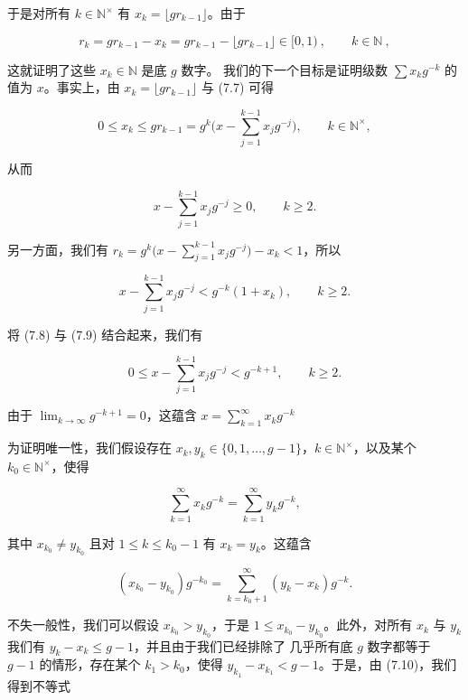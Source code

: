 \begin{theorem}
\begin{items}
于是对所有 $ k \in \mathbb{N}^\times $ 有 $ x_k = \lfloor gr_{k-1} \rfloor $。由于

\[
r_{k}=g r_{k-1}-x_{k}=g r_{k-1}-\lfloor g r_{k-1}\rfloor\in[0,1)~,\qquad k\in\mathbb{N}~,
\]

这就证明了这些 $ x_k \in \mathbb{N} $ 是底 $ g $ 数字。
我们的下一个目标是证明级数 $ \sum x_kg^{-k} $ 的值为 $ x $。事实上，由 $ x_k = \lfloor gr_{k-1} \rfloor $ 与 (7.7) 可得

\[
0\leq x_{k}\leq g r_{k-1}=g^{k}\Big(x-\sum_{j=1}^{k-1}x_{j}g^{-j}\Big),\qquad k\in\mathbb{N}^{\times},
\]

从而

\begin{equation}
x-\sum_{j=1}^{k-1}x_{j}g^{-j}\geq0,\qquad k\geq2.
\end{equation}

另一方面，我们有 $ r_k = g^k \big( x - \sum_{j=1}^{k-1} x_j g^{-j} \big) - x_k < 1 $，所以

\begin{equation}
x-\sum_{j=1}^{k-1}x_{j}g^{-j}<g^{-k}(1+x_{k}),\qquad k\geq2.
\end{equation}

将 (7.8) 与 (7.9) 结合起来，我们有

\[
0\leq x-\sum_{j=1}^{k-1}x_{j}g^{-j}<g^{-k+1},\qquad k\geq2.
\]

由于 $ \lim_{k \to \infty} g^{-k+1} = 0 $，这蕴含 $ x = \sum_{k=1}^{\infty} x_k g^{-k} $

\item

为证明唯一性，我们假设存在 $ x_k, y_k \in \{0,1,\ldots,g-1\} $，$ k \in \mathbb{N}^\times $，以及某个 $ k_0 \in \mathbb{N}^\times $，使得

\[
\sum_{k=1}^{\infty}x_{k}g^{-k}=\sum_{k=1}^{\infty}y_{k}g^{-k},
\]

其中 $ x_{k_0} \neq y_{k_0} $ 且对 $ 1 \leq k \leq k_0 - 1 $ 有 $ x_k = y_k $。这蕴含

\begin{equation}
(x_{k_{0}}-y_{k_{0}})g^{-k_{0}}=\sum_{k=k_{0}+1}^{\infty}(y_{k}-x_{k})g^{-k}.
\end{equation}

不失一般性，我们可以假设 $ x_{k_0} > y_{k_0} $，于是 $ 1 \leq x_{k_0} - y_{k_0} $。此外，对所有 $ x_k $ 与 $ y_k $ 我们有 $ y_k - x_k \leq g - 1 $，并且由于我们已经排除了
几乎所有底 $g$ 数字都等于 $g-1$ 的情形，存在某个 $k_1 > k_0$，使得 $y_{k_1} - x_{k_1} < g-1$。于是，由 (7.10)，我们得到不等式


\end{items}
\end{theorem}
